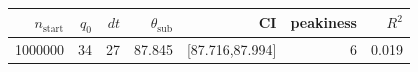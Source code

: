 \begin{tabular}{r r r r r r r}
\hline
$n_{\mathrm{start}}$ & $q_0$ & $dt$ & $\theta_{\mathrm{sub}}$ & CI & peakiness & $R^2$ \\
\hline
1000000 & 34 & 27 & 87.845 & [87.716,87.994] & 6 & 0.019 \\
\hline
\end{tabular}
